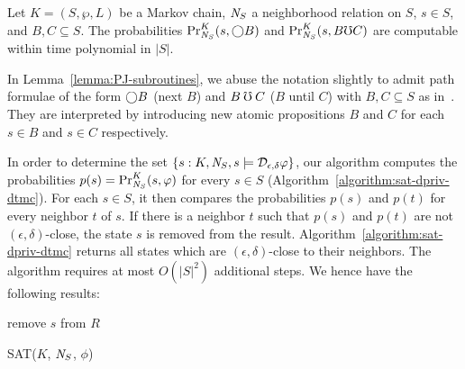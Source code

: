 \begin{lemma}
  Let $K = (S, \wp, L)$ be a Markov chain, $\neighbor{S}$ a
  neighborhood relation on $S$, $s
  \in S$, and $B, C \subseteq S$. The probabilities
  $\myPr{s}{K}{\neighbor{S}}{\gX B}$ and
  $\myPr{s}{K}{\neighbor{S}}{B \mho C}$
\hide{
  $\Pr[\{ \pi : K, \neighbor{K}, \pi \models B \buntil{n} C \textmd{
    with } \pi_0 = s \}]$
} are computable within time polynomial in
  $|S|$.
  \label{lemma:PJ-subroutines}
\end{lemma}

In Lemma~\ref{lemma:PJ-subroutines}, we abuse the notation slightly to
admit path formulae of the form $\gX B$ (next $B$) and
$B \guntil C$ ($B$ until $C$) with $B, C \subseteq S$ as
in~\cite{BK:08:PMC}. They are interpreted by introducing new atomic
propositions $B$ and $C$ for each $s \in B$ and $s \in C$
respectively.

In order to determine the set $\{ s : K, \neighbor{S}, s \models
\dpriv{\epsilon}{\delta} \varphi \}$, our algorithm computes
the probabilities $p (s) = \myPr{s}{K}{\neighbor{S}}{\varphi}$ for every
$s \in S$ (Algorithm~\ref{algorithm:sat-dpriv-dtmc}). For each $s \in S$,
it then compares the probabilities $p (s)$ and $p (t)$ for every
neighbor $t$ of $s$. If there is a neighbor $t$ such that $p (s)$ and
$p (t)$ are not $(\epsilon, \delta)$-close, the state $s$
is removed from the result. 
Algorithm~\ref{algorithm:sat-dpriv-dtmc} returns all states which are
$(\epsilon, \delta)$-close to their neighbors.
The algorithm requires at most $O
(|S|^2)$ additional steps.
We hence have the following results:

\begin{algorithm}[tbh]
  \begin{algorithmic}[1]
    \Match{$\phi$}
    \Case{$\X \Psi$}
    \EndCase
    \EndCase
    \EndMatch
        {remove $s$ from $R$}
        \EndIf
      \EndFor
    \EndFor

    \EndProcedure
  \end{algorithmic}
  \caption{SAT($K$, $\neighbor{S}$, $\phi$)}
  \label{algorithm:sat-dpriv-dtmc}
\end{algorithm}


